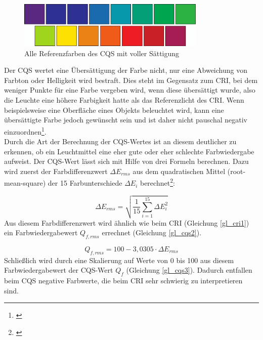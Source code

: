 \begin{figure}[htp]     %
\centering
\includegraphics[width=0.8\textwidth]{bilder/cqs} 
\caption {Alle Referenzfarben des CQS mit voller Sättigung\protect\footnotemark}\label{b_cqs1}
\end{figure}

\noindent Der CQS wertet eine Übersättigung der Farbe nicht, nur eine Abweichung von Farbton oder Helligkeit wird bestraft. Dies steht im Gegensatz zum CRI, bei dem weniger Punkte für eine Farbe vergeben wird, wenn diese übersättigt wurde, also die Leuchte eine höhere Farbigkeit hatte als das Referenzlicht des CRI. Wenn beispielsweise eine Oberfläche eines Objekts beleuchtet wird, kann eine übersättigte Farbe jedoch gewünscht sein und ist daher nicht pauschal negativ einzuordnen\footnote{\cite[3]{davis_ohno}}.\\
\newpage
\noindent Durch die Art der Berechnung der CQS-Wertes ist an diesem deutlicher zu erkennen, ob ein Leuchtmittel eine eher gute oder eher schlechte Farbwiedergabe aufweist. 
Der CQS-Wert lässt sich mit Hilfe von drei Formeln berechnen. Dazu wird zuerst der Farbdifferenzwert $\Delta E_{rms}$ aus dem quadratischen Mittel (root-mean-square) der 15 Farbunterschiede $\Delta E_{i}$ berechnet\footnote{\cite[5]{davis_ohno}}: 

\begin{equation}\label{gl_cqs1}
		\Delta E_{rms} = \sqrt{\frac{1}{15} \sum_{i=1}^{15} \Delta E_{i} ^{2}} 
\end{equation}
Aus diesem Farbdifferenzwert wird ähnlich wie beim CRI (Gleichung \ref{gl_cri1}) ein Farbwiedergabewert $Q_{f,rms}$ errechnet (Gleichung \ref{gl_cqs2}).

\begin{equation}\label{gl_cqs2}
		Q_{f,rms} = 100 - 3,0305 \cdot \Delta E_{rms} 
\end{equation}
Schließlich wird durch eine Skalierung auf Werte von 0 bis 100 aus diesem Farbwiedergabewert der CQS-Wert $Q_{f}$  (Gleichung \ref{gl_cqs3}). Dadurch entfallen beim CQS negative Farbwerte, die beim CRI sehr schwierig zu interpretieren sind. 

